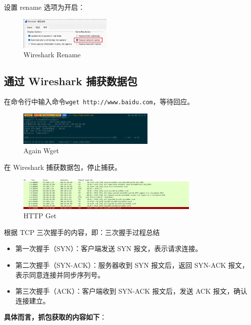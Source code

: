 \documentclass[14pt,a4paper,UTF8,twoside]{article}
\begin{document}
设置 rename 选项为开启：

\begin{figure}[H]
  \centering
  \includegraphics[width=0.4\textwidth]{lab1/rename.png}
  \caption{Wireshark Rename}
\end{figure}

\subsection{通过 Wireshark 捕获数据包}

在命令行中输入命令\texttt{wget http://www.baidu.com}，等待回应。

\begin{figure}[H]
  \centering
  \includegraphics[width=0.6\textwidth]{lab1/againwget.png}
  \caption{Again Wget}
\end{figure}

在 Wireshark 捕获数据包，停止捕获。

\begin{figure}[H]
  \centering
  \includegraphics[width=0.8\textwidth]{lab1/httpget.png}
  \caption{HTTP Get}
\end{figure}


根据 TCP 三次握手的内容，即：三次握手过程总结

\begin{itemize}
  \item 第一次握手（SYN）：客户端发送 SYN 报文，表示请求连接。
  \item 第二次握手（SYN-ACK）：服务器收到 SYN 报文后，返回 SYN-ACK 报文，表示同意连接并同步序列号。
  \item 第三次握手（ACK）：客户端收到 SYN-ACK 报文后，发送 ACK 报文，确认连接建立。
\end{itemize}

\textbf{具体而言，抓包获取的内容如下}：
\end{document}
